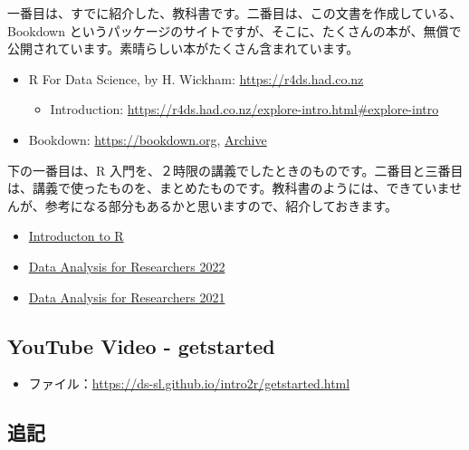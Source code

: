 \documentclass[
]{bxjsbook}
\providecommand{\tightlist}{%
  \setlength{\itemsep}{0pt}\setlength{\parskip}{0pt}}
\theoremstyle{definition}
\theoremstyle{definition}
\theoremstyle{definition}
\theoremstyle{definition}
\theoremstyle{remark}
\begin{document}
一番目は、すでに紹介した、教科書です。二番目は、この文書を作成している、Bookdown というパッケージのサイトですが、そこに、たくさんの本が、無償で公開されています。素晴らしい本がたくさん含まれています。

\begin{itemize}
\tightlist
\item
  R For Data Science, by H. Wickham: \url{https://r4ds.had.co.nz}

  \begin{itemize}
  \tightlist
  \item
    Introduction: \url{https://r4ds.had.co.nz/explore-intro.html\#explore-intro}
  \end{itemize}
\item
  Bookdown: \url{https://bookdown.org}, \href{https://bookdown.org/home/archive/}{Archive}
\end{itemize}

下の一番目は、R 入門を、２時限の講義でしたときのものです。二番目と三番目は、講義で使ったものを、まとめたものです。教科書のようには、できていませんが、参考になる部分もあるかと思いますので、紹介しておきます。

\begin{itemize}
\tightlist
\item
  \href{https://ds-sl.github.io/intro2r/intro2r.nb.html}{Introducton to R}
\item
  \href{https://icu-hsuzuki.github.io/da4r2022/}{Data Analysis for Researchers 2022}
\item
  \href{https://icu-hsuzuki.github.io/da4r2021/}{Data Analysis for Researchers 2021}
\end{itemize}

\hypertarget{youtube-video---getstarted}{%
\subsection{YouTube Video - getstarted}\label{youtube-video---getstarted}}

\begin{itemize}
\tightlist
\item
  ファイル：\url{https://ds-sl.github.io/intro2r/getstarted.html}
\end{itemize}

\hypertarget{ux8ffdux8a18}{%
\subsection{追記}\label{ux8ffdux8a18}}
\end{document}

